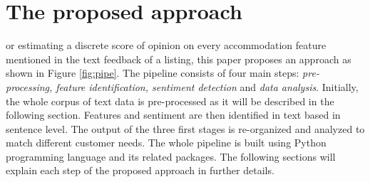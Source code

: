 
%
%
\let\textcircled=\pgftextcircled
\chapter{The proposed approach}

\label{chap:prop}

or estimating a discrete score of opinion on every accommodation feature mentioned in the text feedback of a listing, this paper proposes an approach as shown in Figure \ref{fig:pipe}. The pipeline consists of four main steps: \textit{pre-processing, feature identification, sentiment detection}  and \textit{data analysis}. Initially, the whole corpus of text data is pre-processed as it will be described in the following section. Features and sentiment are then identified in text based in sentence level. The output of the three first stages is re-organized and analyzed to match different customer needs. 
The whole pipeline is built using Python programming language and its related packages. The following sections will explain each step of the proposed approach in further details.
